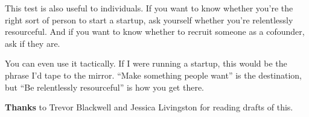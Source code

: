 This test is also useful to individuals. If you want to know whether
you're the right sort of person to start a startup, ask yourself whether
you're relentlessly resourceful. And if you want to know whether to
recruit someone as a cofounder, ask if they are.

You can even use it tactically. If I were running a startup, this would
be the phrase I'd tape to the mirror. ``Make something people want'' is
the destination, but ``Be relentlessly resourceful'' is how you get
there.


\textbf{Thanks} to Trevor Blackwell and Jessica Livingston for reading
drafts of this.
